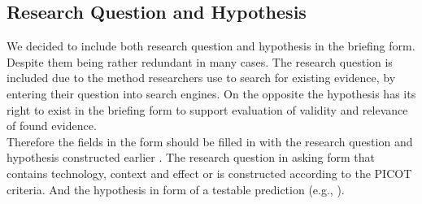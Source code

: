 \subsection{Research Question and Hypothesis}

We decided to include both research question and hypothesis in the briefing form. Despite them being rather redundant in many cases. The research question is included due to the method researchers use to search for existing evidence, by entering their question into search engines. On the opposite the hypothesis has its right to exist in the briefing form to support evaluation of validity and relevance of found evidence. \\
Therefore the fields in the form should be filled in with the research question and hypothesis constructed earlier . The research question in asking form that contains technology, context and effect or is constructed according to the PICOT criteria. And the hypothesis in form of a testable prediction (e.g.,  \cite{Buddies2010}).